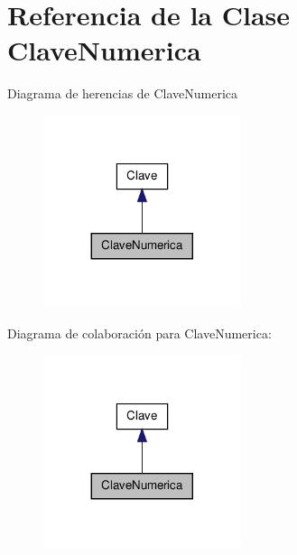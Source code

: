 \hypertarget{class_clave_numerica}{\section{\-Referencia de la \-Clase \-Clave\-Numerica}
\label{class_clave_numerica}
}


\-Diagrama de herencias de \-Clave\-Numerica
\nopagebreak
\begin{figure}[H]
\begin{center}
\leavevmode
\includegraphics[width=164pt]{class_clave_numerica__inherit__graph}
\end{center}
\end{figure}


\-Diagrama de colaboración para \-Clave\-Numerica\-:
\nopagebreak
\begin{figure}[H]
\begin{center}
\leavevmode
\includegraphics[width=164pt]{class_clave_numerica__coll__graph}
\end{center}
\end{figure}
